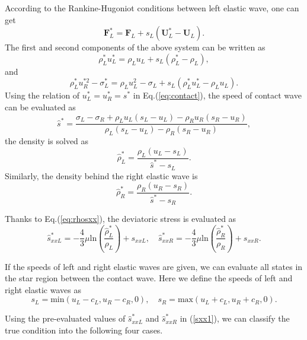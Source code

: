 \documentclass{article}
\numberwithin{equation}{section}
\numberwithin{table}{section}
\begin{document}
According to the Rankine-Hugoniot conditions between left elastic wave, one can get
\begin{equation} \label{eq:RH1}
	\bm{F}_L^* = \bm{F}_L+s_L (\bm{U}_L^*-\bm{U}_L).
\end{equation}
The first and second components of the above system can be written as
\begin{equation} \label{eq:rhoLstar}
  \rho_L^* u_L^*=\rho_L u_L+s_L(\rho_L^*-\rho_L),
\end{equation}
and
\begin{equation}\label{eq:sigma}
  \rho_L^* u_R^{*2}-\sigma^*_L=\rho_L u_L^2-\sigma_L+s_L(\rho_L^* u_L^*-\rho_L u_L).
\end{equation}
Using the relation of $u_L^* =u_R^* = s^*$ in Eq.(\ref{eq:contact}), the speed of contact wave can be evaluated as
\begin{equation}
 \hat{s}^* = \frac{\sigma_L-\sigma_R+\rho_L u_L(s_L-u_L)-\rho_R u_R(s_R-u_R)}{\rho_L(s_L-u_L)-\rho_R(s_R-u_R)},
\end{equation}
the density is solved as
\begin{equation}\label{eq:rhoLs}
  \hat{\rho}_L^* = \frac{\rho_L(u_L-s_L)}{\hat{s}^*-s_L}.
\end{equation}
Similarly, the density behind the right elastic wave is
\begin{equation}\label{eq:rhoLs}
  \hat{\rho}_R^* = \frac{\rho_R(u_R-s_R)}{\hat{s}^*-s_R}.
\end{equation}

Thanks to Eq.(\ref{eq:rhosxx}),  the deviatoric stress is evaluated as
\begin{equation}  \label{sxx1}
  \hat{s}_{xxL}^*=-\frac{4}{3}\mu\text{ln}(\frac{\hat{\rho}_L^*}{\rho_L})+s_{xxL}, \quad   \hat{s}_{xxR}^*=-\frac{4}{3}\mu\text{ln}(\frac{\hat{\rho}_R^*}{\rho_R})+s_{xxR}.
\end{equation}

If the speeds of left and right elastic waves are given, we can evaluate all states in the star region between the contact wave. Here we define the speeds of left and right elastic waves as
	\begin{equation}\label{eq:sLR}
	  s_L = \text{min} (u_L-c_L, u_R-c_R, 0),  \quad s_R = \text{max}(u_L+c_L, u_R+c_R, 0).
	\end{equation}

Using the pre-evaluated values of $\hat{s}_{xxL}^*$ and $\hat{s}_{xxR}^*$ in (\ref{sxx1}), we can classify the true condition into the following four cases.
\end{document}

